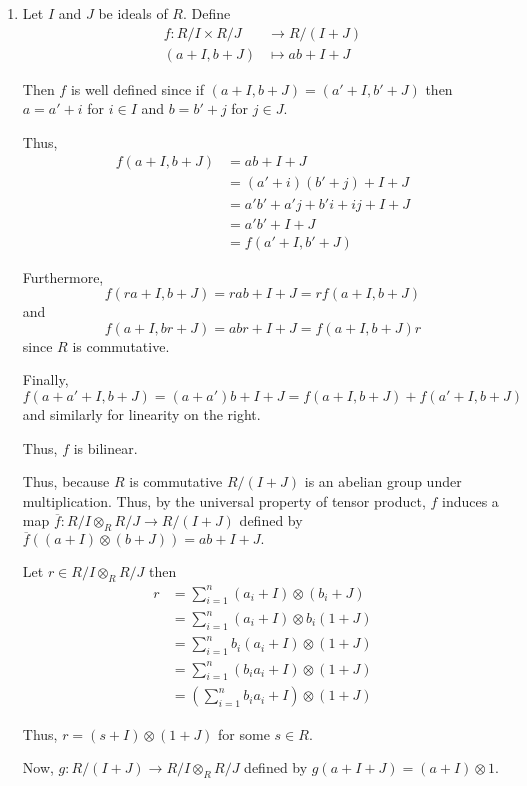\documentclass[12pt]{AlgebraQual}
\begin{document}
\begin{solution}$\,$
\begin{enumerate}[label=(\alph*)]
    \item Let $I$ and $J$ be ideals of $R$. Define \begin{align*}
        f:R/I\times R/J&\to R/(I+J)\\
        (a+I,b+J)&\mapsto ab+I+J
    \end{align*}

    Then $f$ is well defined since if $(a+I,b+J)=(a'+I,b'+J)$ then $a=a'+i$ for $i\in I$ and $b=b'+j$ for $j\in J.$

    Thus, \begin{align*}
        f(a+I,b+J)&=ab+I+J\\
        &=(a'+i)(b'+j)+I+J\\
        &=a'b'+a'j+b'i+ij+I+J\\
        &=a'b'+I+J\\
        &=f(a'+I,b'+J)
    \end{align*}

    Furthermore, $$f(ra+I,b+J)=rab+I+J=rf(a+I,b+J)$$ and $$f(a+I,br+J)=abr+I+J=f(a+I,b+J)r$$ since $R$ is commutative.

    Finally, $$f(a+a'+I,b+J)=(a+a')b+I+J=f(a+I,b+J)+f(a'+I,b+J)$$ and similarly for linearity on the right.

    Thus, $f$ is bilinear.

    Thus, because $R$ is commutative $R/(I+J)$ is an abelian group under multiplication. Thus, by the universal property of tensor product, $f$ induces a map $\overline{f}:R/I\otimes_R R/J\to R/(I+J)$ defined by $\overline{f}((a+I)\otimes(b+J))=ab+I+J.$

    Let $r\in R/I\otimes_R R/J$ then \begin{align*}
        r&=\sum_{i=1}^n(a_i+I)\otimes(b_i+J)\\
        &=\sum_{i=1}^n(a_i+I)\otimes b_i(1+J)\\
        &=\sum_{i=1}^nb_i(a_i+I)\otimes (1+J)\\
        &=\sum_{i=1}^n(b_ia_i+I)\otimes (1+J)\\
        &=\left(\sum_{i=1}^nb_ia_i+I\right)\otimes (1+J)
    \end{align*}

    Thus, $r=(s+I)\otimes(1+J)$ for some $s\in R$.

    Now, $g:R/(I+J)\to R/I\otimes_R R/J$ defined by $g(a+I+J)=(a+I)\otimes 1.$


\end{enumerate}
\end{solution}
\end{document}
